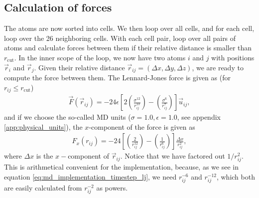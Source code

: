 \subsection{Calculation of forces}
The atoms are now sorted into cells. We then loop over all cells, and for each cell, loop over the 26 neighboring cells. With each cell pair, loop over all pairs of atoms and calculate forces between them if their relative distance is smaller than $r_\text{cut}$. In the inner scope of the loop, we now have two atoms $i$ and $j$ with positions $\vec r_i$ and $\vec r_j$. Given their relative distance $\vec r_{ij} = (\Delta x, \Delta y, \Delta z)$, we are ready to compute the force between them. The Lennard-Jones force is given as (for $r_{ij} \leq r_\text{cut}$)
\begin{align}
	\vec F(\vec r_{ij}) = -24\epsilon\left[2\left(\frac{\sigma^{12}}{r_{ij}^{13}}\right) - \left(\frac{\sigma^6}{r_{ij}^7}\right)\right]\vec u_{ij},
\end{align}
and if we choose the so-called MD units ($\sigma = 1.0, \epsilon = 1.0$, see appendix \ref{app:physical_units}), the $x$-component of the force is given as
\begin{align}
	\label{eq:md_implementation_timestep_lj}
	F_x(r_{ij}) = -24\left[\left(\frac{2}{r_{ij}^{12}}\right) - \left(\frac{1}{r_{ij}^6}\right)\right]\frac{\Delta x}{r_{ij}^2},
\end{align}
where $\Delta x$ is the $x-$component of $\vec r_{ij}$. Notice that we have factored out $1/r_{ij}^2$. This is arithmetical convenient for the implementation, because, as we see in equation \eqref{eq:md_implementation_timestep_lj}, we need $r_{ij}^{-6}$ and $r_{ij}^{-12}$, which both are easily calculated from $r_{ij}^{-2}$ as powers.

